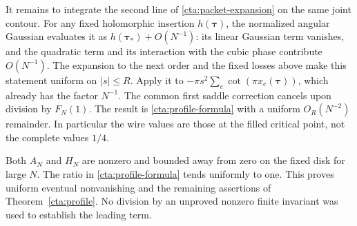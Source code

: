 It remains to integrate the second line of
\eqref{cta:packet-expansion} on the same joint contour.
For any fixed holomorphic insertion \(h(\boldsymbol\tau)\),
the normalized angular Gaussian evaluates it as
\(h(\boldsymbol\tau_*)+O(N^{-1})\): its linear Gaussian
term vanishes, and the quadratic term and its interaction
with the cubic phase contribute \(O(N^{-1})\).
The expansion to the next order and the fixed losses above
make this statement uniform on \(|s|\le R\).
Apply it to
\(-\pi s^2\sum_e\cot(\pi x_e(\boldsymbol\tau))\),
which already has the factor \(N^{-1}\).
The common first saddle correction cancels upon division
by \(F_N(1)\). The result is \eqref{cta:profile-formula}
with a uniform \(O_R(N^{-2})\) remainder.
In particular the wire values are those at the filled
critical point, not the complete values \(1/4\).

Both \(A_N\) and \(H_N\) are nonzero and bounded away from
zero on the fixed disk for large \(N\).
The ratio in \eqref{cta:profile-formula} tends uniformly
to one. This proves uniform eventual nonvanishing and
the remaining assertions of Theorem~\ref{cta:profile}.
No division by an unproved nonzero finite invariant was
used to establish the leading term.


